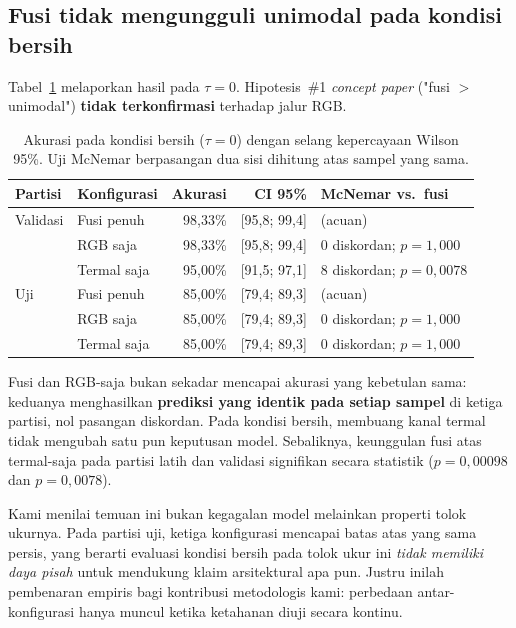 \subsection{Fusi tidak mengungguli unimodal pada kondisi bersih}

Tabel~\ref{tab:bersih} melaporkan hasil pada $\tau = 0$. Hipotesis~\#1
\emph{concept paper} ("fusi $>$ unimodal") \textbf{tidak terkonfirmasi}
terhadap jalur RGB.

\begin{table}[!htbp]
\caption{Akurasi pada kondisi bersih ($\tau = 0$) dengan selang kepercayaan
Wilson 95\%. Uji McNemar berpasangan dua sisi dihitung atas sampel yang sama.}
\label{tab:bersih}
\centering
\begin{tabular}{llrrl}
\hline
\textbf{Partisi} & \textbf{Konfigurasi} & \textbf{Akurasi} & \textbf{CI 95\%}
& \textbf{McNemar vs.\ fusi} \\
\hline
Validasi & Fusi penuh   & 98{,}33\% & [95{,}8; 99{,}4] & (acuan) \\
         & RGB saja     & 98{,}33\% & [95{,}8; 99{,}4] & 0 diskordan; $p = 1{,}000$ \\
         & Termal saja  & 95{,}00\% & [91{,}5; 97{,}1] & 8 diskordan; $p = 0{,}0078$ \\
\hline
Uji      & Fusi penuh   & 85{,}00\% & [79{,}4; 89{,}3] & (acuan) \\
         & RGB saja     & 85{,}00\% & [79{,}4; 89{,}3] & 0 diskordan; $p = 1{,}000$ \\
         & Termal saja  & 85{,}00\% & [79{,}4; 89{,}3] & 0 diskordan; $p = 1{,}000$ \\
\hline
\end{tabular}
\end{table}

Fusi dan RGB-saja bukan sekadar mencapai akurasi yang kebetulan sama: keduanya
menghasilkan \textbf{prediksi yang identik pada setiap sampel} di ketiga
partisi, nol pasangan diskordan. Pada kondisi bersih, membuang kanal termal
tidak mengubah satu pun keputusan model. Sebaliknya, keunggulan fusi atas
termal-saja pada partisi latih dan validasi signifikan secara statistik
($p = 0{,}00098$ dan $p = 0{,}0078$).

Kami menilai temuan ini bukan kegagalan model melainkan properti tolok ukurnya.
Pada partisi uji, ketiga konfigurasi mencapai batas atas yang sama persis, yang
berarti evaluasi kondisi bersih pada tolok ukur ini \emph{tidak memiliki daya
pisah} untuk mendukung klaim arsitektural apa pun. Justru inilah pembenaran
empiris bagi kontribusi metodologis kami: perbedaan antar-konfigurasi hanya
muncul ketika ketahanan diuji secara kontinu.

